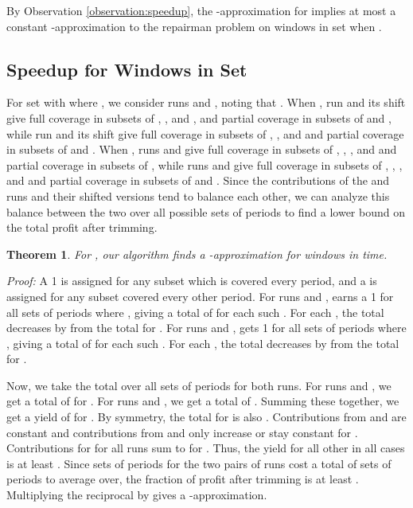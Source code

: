 \documentclass[11pt]{article}
\newtheorem{theorem}{Theorem}[section]
\newcommand\QED{\ifhmode\allowbreak\else\nobreak\fi
\quad\nobreak\medbreak}
\newcommand{\proofstart}{\par\noindent \emph{Proof:} }
\newcommand{\proofend}{\QED\par}
\newenvironment{proof}{\proofstart}{\proofend}
\begin{document}
By Observation \ref{observation:speedup}, the -approximation for  implies at most a constant -approximation to the repairman problem on windows in set  when .

\subsection{Speedup  for Windows in Set }

For set  with  where , we consider runs  and , noting that .
When , run  and its shift give full coverage in subsets of , , and , and partial coverage in subsets of  and , while run  and its shift give full coverage in subsets of , , and  and partial coverage in subsets of  and .  When , runs  and  give full coverage in subsets of , , , and  and partial coverage in subsets of , while runs  and  give full coverage in subsets of , , , and  and partial coverage in subsets of  and .  Since the contributions of the  and  runs and their shifted versions tend to balance each other, we can analyze this balance between the two over all possible sets of periods to find a lower bound on the total profit after trimming.


\begin{theorem}
For , our algorithm finds a -approximation for windows  in  time.
\end{theorem}

\begin{proof}
A 1 is assigned for any subset which is covered every period, and a  is assigned for any subset covered every other period.  For runs  and ,  earns a 1 for all  sets of periods where , giving a total of  for each such .  For each , the total decreases by  from the total for .   For runs  and ,  gets 1 for all  sets of periods where , giving a total of  for each such .  For each , the total decreases by  from the total for .

Now, we take the total over all sets of periods for both runs.  For runs  and , we get a total of  for .  For runs  and , we get a total of .  Summing these together, we get a yield of  for .  By symmetry, the total for  is also .  Contributions from  and  are constant and contributions from  and  only increase or stay constant for .  Contributions for  for all runs sum to  for .   Thus, the yield for all other  in all cases is at least .  Since  sets of periods for the two pairs of runs cost a total of  sets of periods to average over, the fraction of profit after trimming is at least .  Multiplying the reciprocal by  gives a -approximation.
\end{proof}
\end{document}
